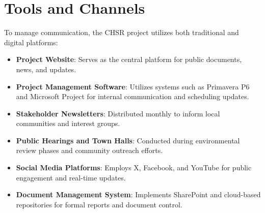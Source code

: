 \section{Tools and Channels}
\parindent20pt To manage communication, the CHSR project utilizes both traditional and digital platforms: \begin{itemize}
	\item\textbf{Project Website}: Serves as the central platform for public documents, news, and updates.
	\item\textbf{Project Management Software}: Utilizes systems such as Primavera P6 and Microsoft Project for internal communication and scheduling updates.
	\item\textbf{Stakeholder Newsletters}: Distributed monthly to inform local communities and interest groups.
	\item\textbf{Public Hearings and Town Halls}: Conducted during environmental review phases and community outreach efforts.
	\item\textbf{Social Media Platforms}: Employs X, Facebook, and YouTube for public engagement and real-time updates.
	\item\textbf{Document Management System}: Implements SharePoint and cloud-based repositories for formal reports and document control.
\end{itemize}

